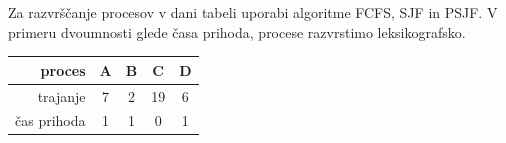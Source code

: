 \begin{Exercise}
Za razvrščanje procesov v dani tabeli uporabi algoritme FCFS, SJF in PSJF. V primeru dvoumnosti glede časa prihoda, procese razvrstimo leksikografsko.
\par\vspace{5pt}
{\centering
\begin{tabular}{r|cccc}
	proces & A & B & C & D \\
	\hline
	trajanje & 7 & 2 & 19 & 6  \\
	čas prihoda & 1 & 1 & 0 & 1 \\
\end{tabular}\\}
\end{Exercise}
